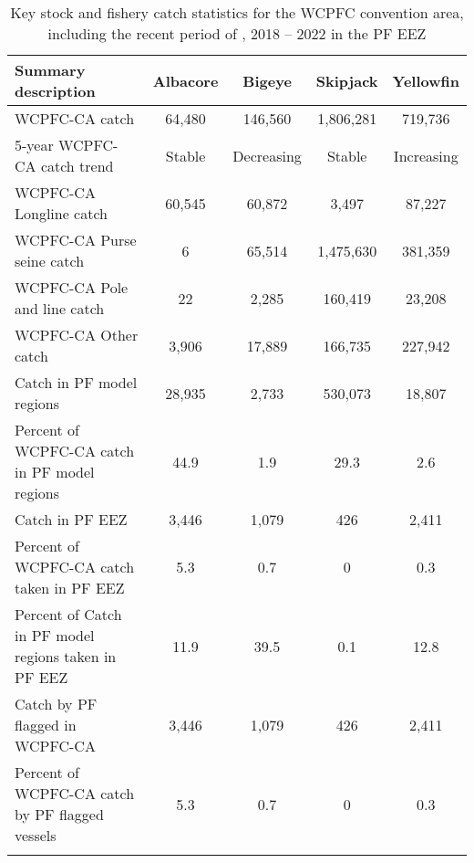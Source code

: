 \begin{longtable}{lcccc}
\caption{Key stock and fishery catch statistics for the WCPFC convention area, including the recent period of , 2018 -- 2022 in the PF EEZ} \\ 
  \hline
Summary description & Albacore & Bigeye & Skipjack & Yellowfin \\ 
  \hline
WCPFC-CA catch & 64,480 & 146,560 & 1,806,281 & 719,736 \\ 
  5-year WCPFC-CA catch trend & Stable & Decreasing & Stable & Increasing \\ 
  WCPFC-CA Longline catch & 60,545 & 60,872 & 3,497 & 87,227 \\ 
  WCPFC-CA Purse seine catch & 6 & 65,514 & 1,475,630 & 381,359 \\ 
  WCPFC-CA Pole and line catch & 22 & 2,285 & 160,419 & 23,208 \\ 
  WCPFC-CA Other catch & 3,906 & 17,889 & 166,735 & 227,942 \\ 
  Catch in PF model regions & 28,935 & 2,733 & 530,073 & 18,807 \\ 
  Percent of WCPFC-CA catch in PF model regions & 44.9 & 1.9 & 29.3 & 2.6 \\ 
   \hline
Catch in PF EEZ & 3,446 & 1,079 & 426 & 2,411 \\ 
  Percent of WCPFC-CA catch taken in PF EEZ & 5.3 & 0.7 & 0 & 0.3 \\ 
  Percent of Catch in PF model regions taken in PF EEZ & 11.9 & 39.5 & 0.1 & 12.8 \\ 
  Catch by PF flagged in WCPFC-CA & 3,446 & 1,079 & 426 & 2,411 \\ 
  Percent of WCPFC-CA catch by PF flagged vessels & 5.3 & 0.7 & 0 & 0.3 \\ 
  \hline
\label{cat_sum_tab}
\end{longtable}
